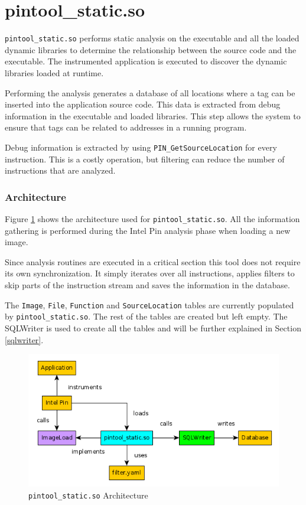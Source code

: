 \section{pintool\_static.so}
\label{cap3:pintoolstatic}

\texttt{pintool\_static.so} performs static analysis on the executable and all the loaded dynamic libraries to determine the relationship between the source code and the executable. The instrumented application is executed to discover the dynamic libraries loaded at runtime.

Performing the analysis generates a database of all locations where a tag can be inserted into the application source code. This data is extracted from debug information in the executable and loaded libraries. This step allows the system to ensure that tags can be related to addresses in a running program.

Debug information is extracted by using \texttt{PIN\_GetSourceLocation} \cite{pindoc} for every instruction. This is a costly operation, but filtering can reduce the number of instructions that are analyzed.

\subsubsection{Architecture}

Figure \ref{cap3:static-arch} shows the architecture used for \texttt{pintool\_static.so}. All the information gathering is performed during the Intel Pin analysis phase when loading a new image.

Since analysis routines are executed in a critical section \cite{pindoc} this tool does not require its own synchronization. It simply iterates over all instructions, applies filters to skip parts of the instruction stream and saves the information in the database.

The \texttt{Image}, \texttt{File}, \texttt{Function} and \texttt{SourceLocation} tables are currently populated by \texttt{pintool\_static.so}. The rest of the tables are created but left empty. The SQLWriter is used to create all the tables and will be further explained in Section \ref{sqlwriter}.

\begin{figure}
	\centering
	\includegraphics[width=1\textwidth]{static-arch}
	\caption{\texttt{pintool\_static.so} Architecture}
	\label{cap3:static-arch}
\end{figure}

